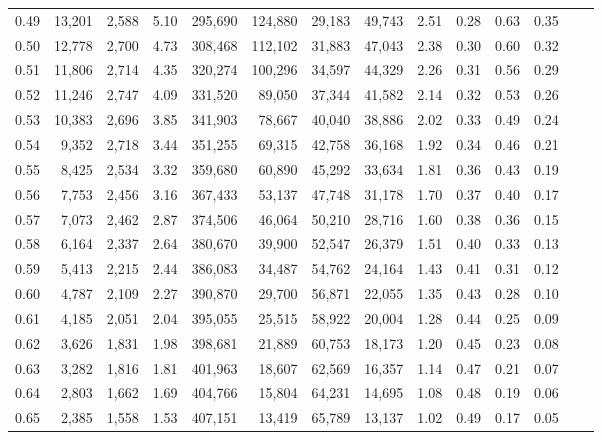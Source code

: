 \begin{tabular}{rrrrrrrrrrrrrr}
0.49 &  13,201 &  2,588 &    5.10 &  295,690 &  124,880 &  29,183 &  49,743 &  2.51 &  0.28 &  0.63 &      0.35 \\
0.50 &  12,778 &  2,700 &    4.73 &  308,468 &  112,102 &  31,883 &  47,043 &  2.38 &  0.30 &  0.60 &      0.32 \\
0.51 &  11,806 &  2,714 &    4.35 &  320,274 &  100,296 &  34,597 &  44,329 &  2.26 &  0.31 &  0.56 &      0.29 \\
0.52 &  11,246 &  2,747 &    4.09 &  331,520 &   89,050 &  37,344 &  41,582 &  2.14 &  0.32 &  0.53 &      0.26 \\
0.53 &  10,383 &  2,696 &    3.85 &  341,903 &   78,667 &  40,040 &  38,886 &  2.02 &  0.33 &  0.49 &      0.24 \\
0.54 &   9,352 &  2,718 &    3.44 &  351,255 &   69,315 &  42,758 &  36,168 &  1.92 &  0.34 &  0.46 &      0.21 \\
0.55 &   8,425 &  2,534 &    3.32 &  359,680 &   60,890 &  45,292 &  33,634 &  1.81 &  0.36 &  0.43 &      0.19 \\
0.56 &   7,753 &  2,456 &    3.16 &  367,433 &   53,137 &  47,748 &  31,178 &  1.70 &  0.37 &  0.40 &      0.17 \\
0.57 &   7,073 &  2,462 &    2.87 &  374,506 &   46,064 &  50,210 &  28,716 &  1.60 &  0.38 &  0.36 &      0.15 \\
0.58 &   6,164 &  2,337 &    2.64 &  380,670 &   39,900 &  52,547 &  26,379 &  1.51 &  0.40 &  0.33 &      0.13 \\
0.59 &   5,413 &  2,215 &    2.44 &  386,083 &   34,487 &  54,762 &  24,164 &  1.43 &  0.41 &  0.31 &      0.12 \\
0.60 &   4,787 &  2,109 &    2.27 &  390,870 &   29,700 &  56,871 &  22,055 &  1.35 &  0.43 &  0.28 &      0.10 \\
0.61 &   4,185 &  2,051 &    2.04 &  395,055 &   25,515 &  58,922 &  20,004 &  1.28 &  0.44 &  0.25 &      0.09 \\
0.62 &   3,626 &  1,831 &    1.98 &  398,681 &   21,889 &  60,753 &  18,173 &  1.20 &  0.45 &  0.23 &      0.08 \\
0.63 &   3,282 &  1,816 &    1.81 &  401,963 &   18,607 &  62,569 &  16,357 &  1.14 &  0.47 &  0.21 &      0.07 \\
0.64 &   2,803 &  1,662 &    1.69 &  404,766 &   15,804 &  64,231 &  14,695 &  1.08 &  0.48 &  0.19 &      0.06 \\
0.65 &   2,385 &  1,558 &    1.53 &  407,151 &   13,419 &  65,789 &  13,137 &  1.02 &  0.49 &  0.17 &      0.05 \\

\end{tabular}
